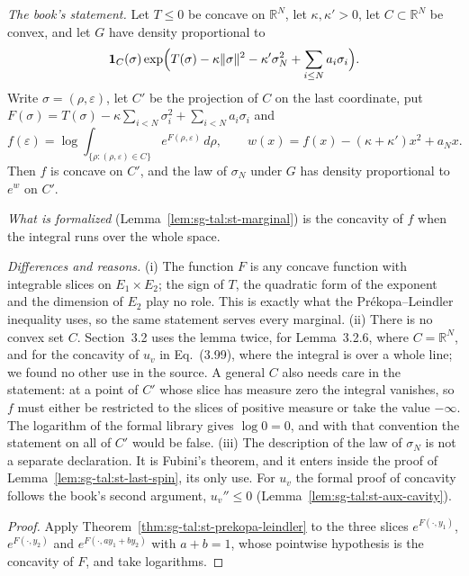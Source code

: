 \begin{remark}\label{rem:sg-tal:st-lemma-325}
\emph{The book's statement.} Let $T\le0$ be concave on $\mathbb R^N$, let $\kappa,\kappa'>0$, let
$C\subset\mathbb R^N$ be convex, and let $G$ have density proportional to
\[
\mathbf 1_C(\sigma)\exp\Bigl(T(\sigma)-\kappa\|\sigma\|^2-\kappa'\sigma_N^2+\sum_{i\le N}a_i\sigma_i\Bigr).
\]
Write $\sigma=(\rho,\varepsilon)$, let $C'$ be the projection of $C$ on the last coordinate, put
$F(\sigma)=T(\sigma)-\kappa\sum_{i<N}\sigma_i^2+\sum_{i<N}a_i\sigma_i$ and
\[
f(\varepsilon)=\log\int_{\{\rho:(\rho,\varepsilon)\in C\}}e^{F(\rho,\varepsilon)}\,d\rho,\qquad
w(x)=f(x)-(\kappa+\kappa')x^2+a_Nx .
\]
Then $f$ is concave on $C'$, and the law of $\sigma_N$ under $G$ has density proportional to $e^{w}$ on $C'$.

\emph{What is formalized} (Lemma~\ref{lem:sg-tal:st-marginal}) is the concavity of $f$ when the integral
runs over the whole space.

\emph{Differences and reasons.}
(i) The function $F$ is any concave function with integrable slices on $E_1\times E_2$; the sign of $T$, the
quadratic form of the exponent and the dimension of $E_2$ play no role. This is exactly what the
Pr\'ekopa--Leindler inequality uses, so the same statement serves every marginal.
(ii) There is no convex set $C$. Section~3.2 uses the lemma twice, for Lemma~3.2.6, where $C=\mathbb R^N$, and
for the concavity of $u_v$ in Eq.~(3.99), where the integral is over a whole line; we found no other use in the
source. A general $C$ also needs care in the statement: at a point of $C'$ whose slice has measure zero the
integral vanishes, so $f$ must either be restricted to the slices of positive measure or take the value
$-\infty$. The logarithm of the formal library gives $\log0=0$, and with that convention the statement on all of
$C'$ would be false.
(iii) The description of the law of $\sigma_N$ is not a separate declaration. It is Fubini's theorem, and it
enters inside the proof of Lemma~\ref{lem:sg-tal:st-last-spin}, its only use. For $u_v$ the formal proof of
concavity follows the book's second argument, $u_v''\le0$ (Lemma~\ref{lem:sg-tal:st-aux-cavity}).
\end{remark}
\begin{proof}
  \leanok
Apply Theorem~\ref{thm:sg-tal:st-prekopa-leindler} to the three slices $e^{F(\cdot,y_1)}$,
$e^{F(\cdot,y_2)}$ and $e^{F(\cdot,ay_1+by_2)}$ with $a+b=1$, whose pointwise hypothesis is the concavity of
$F$, and take logarithms.
\end{proof}

